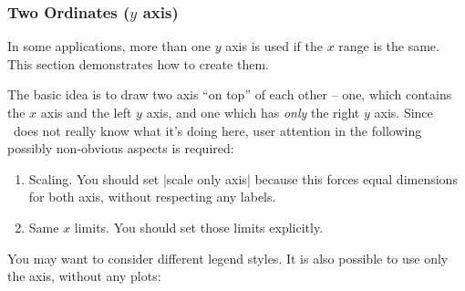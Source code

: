 \subsubsection[Two Ordinates]{Two Ordinates ($y$ axis)}
{%
%
In some applications, more than one $y$ axis is used if the $x$ range is the same. This section demonstrates how to create them.

\begin{codeexample}[]
\end{codeexample}
\noindent The basic idea is to draw two axis ``on top'' of each other -- one, which contains the $x$ axis and the left $y$ axis, and one which has \emph{only} the right $y$ axis. Since \PGFPlots\ does not really know what it's doing here, user attention in the following possibly non-obvious aspects is required:
\begin{enumerate}
	\item Scaling. You should set |scale only axis| because this forces equal dimensions for both axis, without respecting any labels.
	\item Same $x$ limits. You should set those limits explicitly.
\end{enumerate}
You may want to consider different legend styles.
It is also possible to use only the axis, without any plots:
\begin{codeexample}[]
\end{codeexample}
}

